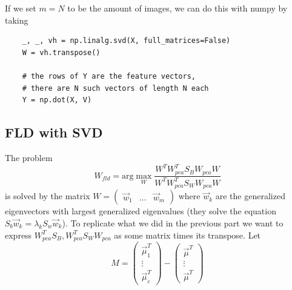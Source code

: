 \documentclass{amsart}
\theoremstyle{definition}
\theoremstyle{remark}
\begin{document}
If we set $m = N$ to be the amount of images, we can do this with numpy by taking 
\begin{lstlisting}
	_, _, vh = np.linalg.svd(X, full_matrices=False)
	W = vh.transpose()

	# the rows of Y are the feature vectors, 
	# there are N such vectors of length N each
	Y = np.dot(X, V)
\end{lstlisting}

\subsection{FLD with SVD}
The problem
\begin{equation}W_{fld} = \text{arg}\max\limits_W \frac{W^T W_{pca}^TS_BW_{pca} W}{W^T W_{pca}^TS_WW_{pca} W}\label{eq:fld} \end{equation}
is solved by the matrix $W = \begin{pmatrix} \vec{w}_1 & \ldots & \vec{w}_m\end{pmatrix}$ where $\vec{w}_k$ are the generalized eigenvectors with largest generalized eigenvalues (they solve the equation $S_b \vec{w}_k = \lambda_k S_w\vec{w}_k$).
To replicate what we did in the previous part we want to express $W_{pca}^TS_B, W_{pca}^TS_WW_{pca}$ as some matrix times its transpose. Let 
$$M = \begin{pmatrix}\vec{\mu}_1^T \\ \vdots \\ \vec{\mu}_c^T\end{pmatrix} - \begin{pmatrix}\vec{\mu}^T \\ \vdots \\ \vec{\mu}^T\end{pmatrix} $$
\end{document}
